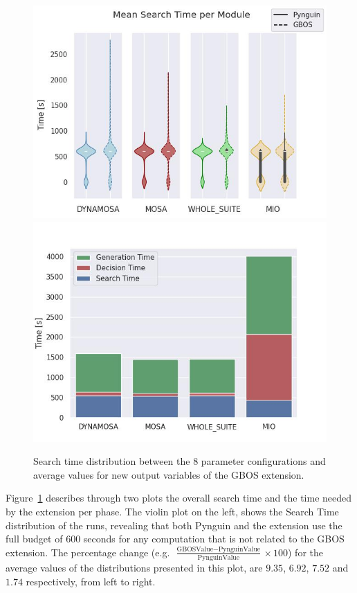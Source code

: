 \documentclass[%
  chapterprefix=false,%
  open=right,%
  twoside=true,%
  paper=a4,%
  logofile={Figures/logo.png},%
  thesistype=master,%
  UKenglish,%
]{se2thesis}
\begin{document}
\begin{figure}[b]
    \includegraphics[width=\linewidth]{Figures/Results/SearchTime.jpg}
  \endminipage\hfill
    \includegraphics[width=\linewidth]{Figures/Results/timeDist.jpg}
  \endminipage\@
  \caption{Search time distribution between the 8 parameter configurations and average values for new output variables of the GBOS extension.}\label{fig:times}
\end{figure}

Figure~\ref{fig:times} describes through two plots the overall search time and the time needed by the extension per phase.
The violin plot on the left, shows the Search Time distribution of the runs, revealing that both Pynguin and the extension use the full budget of 600 seconds for any computation that is not related to the GBOS extension.
The percentage change (e.g.~\(\frac{\text{GBOSValue} - \text{PynguinValue}}{\text{PynguinValue}}\times 100\)) for the average values of the distributions presented in this plot, are \(9.35\), \(6.92\), \(7.52\) and \(1.74\) respectively, from left to right.
\end{document}
